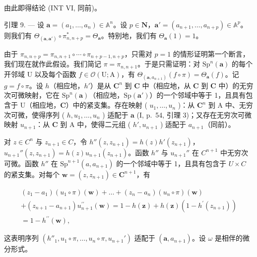 由此即得结论 (INT VI, 同前)。

引理 9. --- 设 \(\boldsymbol{a} = (a_1, \ldots, a_n) \in \mathbb{A}^n\)。设 \(p \in \mathbf{N}\)，\(\boldsymbol{a}' = (a_{n+1}, \ldots, a_{n+p}) \in \mathbb{A}^p\)。则我们有 \(\Theta_{(\boldsymbol{a}, \boldsymbol{a}')} \circ \pi_{n,n+p}^* = \Theta_{\boldsymbol{a}}\)。特别地，我们有 \(\Theta_{\boldsymbol{a}}(1) = 1\)。

由于 \(\pi_{n,n+p} = \pi_{n,n+1} \circ \cdots \circ \pi_{n+p-1,n+p}\)，只需对 \(p = 1\) 的情形证明第一个断言，我们现在就作此假设。我们简记 \(\pi = \pi_{n,n+1}\)。于是只需证明：对 \(\mathrm{Sp}^n(\boldsymbol{a})\) 的每个开邻域 U 以及每个函数 \(f \in \mathcal{O}(\mathrm{U};\mathrm{A})\)，有 \(\Theta_{(\boldsymbol{a},a_{n+1})}(f \circ \pi) = \Theta_{\boldsymbol{a}}(f)\)。记 \(g = f \circ \pi\)。设 \(h\)（相应地，\(h'\)）是从 \(\mathbf{C}^n\) 到 \(\mathbf{C}\) 中（相应地，从 \(\mathbf{C}\) 到 \(\mathbf{C}\) 中）的无穷次可微映射，它在 \(\mathrm{Sp}^n(\boldsymbol{a})\)（相应地，\(\mathrm{Sp}(\boldsymbol{a}')\)）的一个邻域中等于 1，且具有包含于 U（相应地，\(\mathbf{C}\)）中的紧支集。存在映射 ( \(u_1, \ldots, u_n\) )：从 \(\mathbf{C}^n\) 到 A 中、无穷次可微，使得序列 ( \(h, u_1, \ldots, u_n\) ) 适配于 \(\boldsymbol{a}\) (I, p.~54, 引理 3)；又存在无穷次可微映射 \(u_{n+1}\)：从 \(\mathbf{C}\) 到 A 中，使得二元组 ( \(h', u_{n+1} \) ) 适配于 \(a_{n+1}\)（同前）。

对 \(z \in C^{n}\) 与 \(z_{n+1} \in C\)，令 \(h''(z, z_{n+1}) = h(z)h'(z_{n+1})\)，\(u_{n+1}''(z, z_{n+1}) = h(z)u_{n+1}(z_{n+1})\)。函数 \(h''\) 与 \(u_{n+1}''\) 在 \(C^{n+1}\) 中无穷次可微。函数 \(h''\) 在 \(\mathrm{Sp}^{n+1}(a, a_{n+1})\) 的一个邻域中等于 1，且具有包含于 \(U \times C\) 的紧支集。对每个 \(\boldsymbol{w} = (z, z_{n+1}) \in \mathbf{C}^{n+1}\)，有

\[
\begin{array}{c} (z _ {1} - a _ {1}) (u _ {1} \circ \pi) (\boldsymbol {w}) + \dots + (z _ {n} - a _ {n}) (u _ {n} \circ \pi) (\boldsymbol {w}) \\ + (z _ {n + 1} - a _ {n + 1}) u _ {n + 1} ^ {\prime \prime} (\boldsymbol {w}) = 1 - h (\boldsymbol {z}) + h (\boldsymbol {z}) (1 - h ^ {\prime} (z _ {n + 1})) \\ = 1 - h ^ {\prime \prime} (\boldsymbol {w}), \end{array}
\]

这表明序列 \((h''_{1}, u_{1} \circ \pi, \ldots, u_{n} \circ \pi, u_{n+1}')\) 适配于 \((\boldsymbol{a}, a_{n+1})\)。设 \(\omega\) 是相伴的微分形式。

